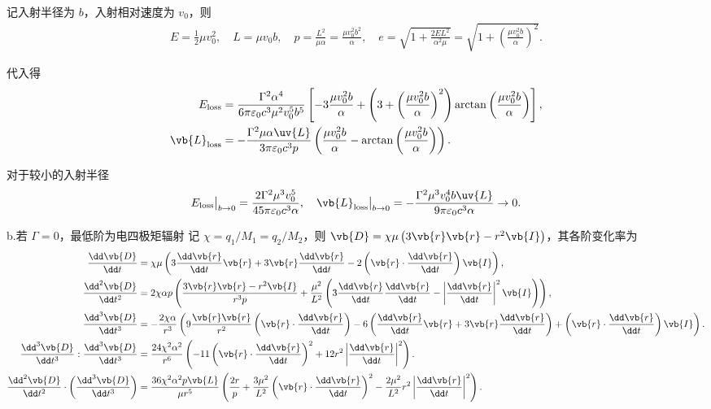 \begin{exbox}
	记入射半径为 \(b\)，入射相对速度为 \(v_0\)，则
	\begin{align*}
		E = \frac{1}{2}\mu v_0^2, \quad L = \mu v_0 b, \quad p = \frac{L^2}{\mu\alpha} = \frac{\mu v_0^2 b^2}{\alpha}, \quad e = \sqrt{1 + \frac{2 E L^2}{\alpha^2 \mu}} = \sqrt{1 + \left( \frac{\mu v_0^2 b}{\alpha} \right)^2}.
	\end{align*}

	代入得
	\begin{align*}
		E_{\text{loss}} &= \frac{\Gamma^2 \alpha^4}{6\pi\varepsilon_0 c^3 \mu^2 v_0^5 b^5} \left[ -3\frac{\mu v_0^2 b}{\alpha} + \left( 3 + \left( \frac{\mu v_0^2 b}{\alpha} \right)^2 \right) \arctan\left( \frac{\mu v_0^2 b}{\alpha} \right) \right], \\
		\vb{L}_{\text{loss}} &= -\frac{\Gamma^2 \mu \alpha \uv{L}}{3\pi\varepsilon_0 c^3 p} \left( \frac{\mu v_0^2 b}{\alpha} - \arctan\left( \frac{\mu v_0^2 b}{\alpha} \right) \right).
	\end{align*}

	对于较小的入射半径
	\begin{align*}
		E_{\text{loss}}\big|_{b \to 0} = \frac{2\Gamma^2 \mu^3 v_0^5}{45\pi\varepsilon_0 c^3 \alpha}, \quad \vb{L}_{\text{loss}}\big|_{b \to 0} = -\frac{\Gamma^2 \mu^3 v_0^4 b \uv{L}}{9\pi\varepsilon_0 c^3 \alpha} \to 0.
	\end{align*}


	b.若 \(\Gamma = 0\)，最低阶为电四极矩辐射
	记 \(\chi = q_1/M_1=q_2/M_2\)，则 \(\vb{D} = \chi \mu \left( 3\vb{r}\vb{r} - r^2 \vb{I} \right)\)，其各阶变化率为
	\begin{align*}
		\frac{\dd \vb{D}}{\dd t} &= \chi \mu \left( 3\frac{\dd \vb{r}}{\dd t}\vb{r} + 3\vb{r}\frac{\dd \vb{r}}{\dd t} - 2\left( \vb{r} \cdot \frac{\dd \vb{r}}{\dd t} \right)\vb{I} \right), \\
		\frac{\dd^2\vb{D}}{\dd t^2} &= 2\chi \alpha p \left( \frac{3\vb{r}\vb{r} - r^2 \vb{I}}{r^3 p} + \frac{\mu^2}{L^2} \left( 3\frac{\dd \vb{r}}{\dd t}\frac{\dd \vb{r}}{\dd t} - \left| \frac{\dd \vb{r}}{\dd t} \right|^2 \vb{I} \right) \right), \\
		\frac{\dd^3\vb{D}}{\dd t^3} &= -\frac{2\chi \alpha}{r^3} \left( 9\frac{\vb{r}\vb{r}}{r^2} \left( \vb{r} \cdot \frac{\dd \vb{r}}{\dd t} \right) - 6\left( \frac{\dd \vb{r}}{\dd t}\vb{r} + 3\vb{r}\frac{\dd \vb{r}}{\dd t} \right) + \left( \vb{r} \cdot \frac{\dd \vb{r}}{\dd t} \right)\vb{I} \right).\\
		\frac{\dd^3\vb{D}}{\dd t^3} : \frac{\dd^3\vb{D}}{\dd t^3} &= \frac{24\chi^2 \alpha^2}{r^6} \left( -11\left( \vb{r} \cdot \frac{\dd \vb{r}}{\dd t} \right)^2 + 12 r^2 \left| \frac{\dd \vb{r}}{\dd t} \right|^2 \right).\\
		\frac{\dd^2\vb{D}}{\dd t^2} \cdot \left( \frac{\dd^3\vb{D}}{\dd t^3} \right) &= \frac{36\chi^2 \alpha^2 p \vb{L}}{\mu r^5} \left( \frac{2r}{p} + \frac{3\mu^2}{L^2} \left( \vb{r} \cdot \frac{\dd \vb{r}}{\dd t} \right)^2 - \frac{2\mu^2}{L^2} r^2 \left| \frac{\dd \vb{r}}{\dd t} \right|^2 \right).
	\end{align*}


\end{exbox}
